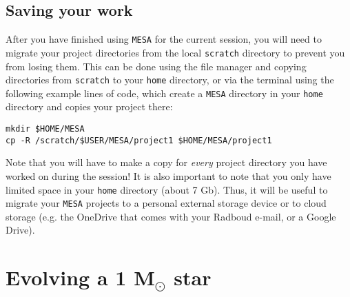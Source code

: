 \documentclass[11pt,a4paper]{article}
\begin{document}
\subsection{Saving your work}

After you have finished using \texttt{MESA} for the current session, you will need to migrate your project directories from the local \texttt{scratch} directory to prevent you from losing them. This can be done using the file manager and copying directories from \texttt{scratch} to your \texttt{home} directory, or via the terminal using the following example lines of code, which create a \texttt{MESA} directory in your \texttt{home} directory and copies your project there:

\begin{verbatim}
mkdir $HOME/MESA
cp -R /scratch/$USER/MESA/project1 $HOME/MESA/project1
\end{verbatim}

\noindent
Note that you will have to make a copy for \emph{every} project directory you have worked on during the session! It is also important to note that you only have limited space in your \texttt{home} directory (about 7 Gb). Thus, it will be useful to migrate your \texttt{MESA} projects to a personal external storage device or to cloud storage (e.g. the OneDrive that comes with your Radboud e-mail, or a Google Drive). 


\section{Evolving a 1 \texorpdfstring{M$_\odot$}{Msun} star}
\end{document}

